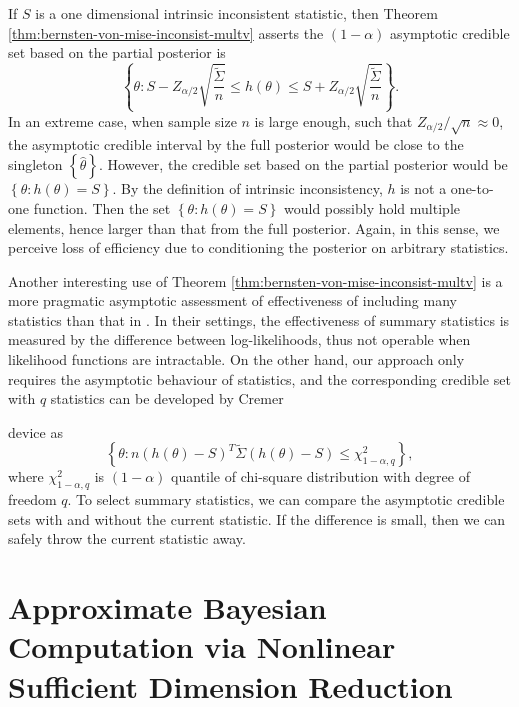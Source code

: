 \documentclass[oneside,english]{amsbook}
\numberwithin{section}{chapter}
\numberwithin{equation}{section}
\numberwithin{figure}{section}
\theoremstyle{plain}
\theoremstyle{plain}
\theoremstyle{definition}
\theoremstyle{plain}
\theoremstyle{plain}
\theoremstyle{remark}
\theoremstyle{definition}
\theoremstyle{definition}
\begin{document}
If $S$ is a one dimensional intrinsic inconsistent statistic, then
Theorem \ref{thm:bernsten-von-mise-inconsist-multv} asserts the $\left(1-\alpha\right)$
asymptotic credible set based on {{} } {the
} partial posterior is 
\[
\left\{ \theta:S-Z_{\alpha/2}\sqrt{\frac{\tilde{\Sigma}}{n}}\le h\left(\theta\right)\le S+Z_{\alpha/2}\sqrt{\frac{\tilde{\Sigma}}{n}}\right\} .
\]
In an extreme case, when sample size $n$ is large enough, such that
$Z_{\alpha/2}/\sqrt{n}\approx0$, the asymptotic credible interval
by {{} } {the } full posterior would be
close to the singleton $\left\{ \hat{\theta}\right\} $. However,
the credible set based on {{} } {the } partial
posterior would be $\left\{ \theta:h\left(\theta\right)=S\right\} $.
By the definition of intrinsic inconsistency, $h$ is not a one-to-one
function. Then the set $\left\{ \theta:h\left(\theta\right)=S\right\} $
would possibly hold multiple elements, hence larger than that from {{}
} {the } full posterior. Again, in this sense, we
perceive loss of efficiency due to conditioning the posterior on arbitrary
statistics. 

Another interesting use of Theorem \ref{thm:bernsten-von-mise-inconsist-multv}
is a more pragmatic asymptotic assessment of effectiveness of including {{}
} {many} statistics than that in \citet{joyce2008approximately}.
In their settings, the effectiveness of summary statistics is measured
by the difference between log-likelihoods, thus not operable when
likelihood  {{} functions are} intractable. On the other
hand, our approach only {{} } {requires
}the asymptotic behaviour of statistics, and the corresponding credible
set with $q$ statistics can be developed by Cremer%

{} device as 
\[
\left\{ \theta:n\left(h\left(\theta\right)-S\right)^{T}\tilde{\Sigma}\left(h\left(\theta\right)-S\right)\le\chi_{1-\alpha,q}^{2}\right\} ,
\]
where $\chi_{1-\alpha,q}^{2}$ is $\left(1-\alpha\right)$ quantile
of chi-square distribution with degree of freedom $q$. To select
summary statistics, we can compare the asymptotic credible sets with
and without the current statistic. If the difference is small, then
we can safely throw the current statistic away. 


\section{\label{sec:abc-sdr}Approximate Bayesian Computation {{}
} {via } Nonlinear Sufficient Dimension Reduction}
\end{document}
